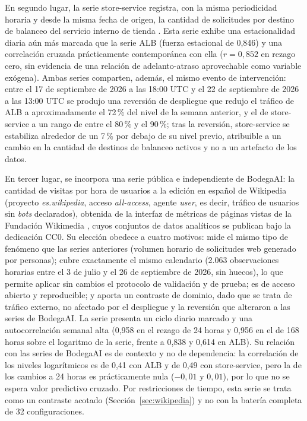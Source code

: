 En segundo lugar, la serie store-service registra, con la misma periodicidad horaria y desde la misma
fecha de origen, la cantidad de solicitudes por destino de balanceo del servicio interno de tienda
\parencite{datos_storeservice_tpfinal}. Esta serie exhibe una estacionalidad diaria aún más marcada que la
serie ALB (fuerza estacional de 0,846) y una correlación cruzada prácticamente contemporánea con ella
($r=0,852$ en rezago cero, sin evidencia de una relación de adelanto-atraso aprovechable como variable
exógena). Ambas series comparten, además, el mismo evento de intervención: entre el 17 de septiembre de
2026 a las 18:00 UTC y el 22 de septiembre de 2026 a las 13:00 UTC se produjo una reversión de despliegue
que redujo el tráfico de ALB a aproximadamente el 72\,\% del nivel de la semana anterior, y el de
store-service a un rango de entre el 80\,\% y el 90\,\%; tras la reversión, store-service se estabiliza
alrededor de un 7\,\% por debajo de su nivel previo, atribuible a un cambio en la cantidad de destinos de
balanceo activos y no a un artefacto de los datos.

En tercer lugar, se incorpora una serie pública e independiente de BodegaAI: la cantidad de visitas por
hora de usuarios a la edición en español de Wikipedia (proyecto \emph{es.wikipedia}, acceso
\emph{all-access}, agente \emph{user}, es decir, tráfico de usuarios sin \emph{bots} declarados), obtenida
de la interfaz de métricas de páginas vistas de la Fundación Wikimedia \parencite{datos_wikipedia_tpfinal},
cuyos conjuntos de datos analíticos se publican bajo la dedicación CC0. Su elección obedece a cuatro motivos:
mide el mismo tipo de fenómeno que las series anteriores (volumen horario de solicitudes web generado por
personas); cubre exactamente el mismo calendario (2.063 observaciones horarias entre el 3 de julio y el 26 de
septiembre de 2026, sin huecos), lo que permite aplicar sin cambios el protocolo de validación y de prueba;
es de acceso abierto y reproducible; y aporta un contraste de dominio, dado que se trata de tráfico externo,
no afectado por el despliegue y la reversión que alteraron a las series de BodegaAI. La serie presenta un
ciclo diario marcado y una autocorrelación semanal alta (0,958 en el rezago de 24 horas y 0,956 en el de 168
horas sobre el logaritmo de la serie, frente a 0,838 y 0,614 en ALB). Su relación con las series de BodegaAI
es de contexto y no de dependencia: la correlación de los niveles logarítmicos es de 0,41 con ALB y de 0,49
con store-service, pero la de los cambios a 24 horas es prácticamente nula ($-0,01$ y $0,01$), por lo que no
se espera valor predictivo cruzado. Por restricciones de tiempo, esta serie se trata como un contraste
acotado (Sección~\ref{sec:wikipedia}) y no con la batería completa de 32 configuraciones.

